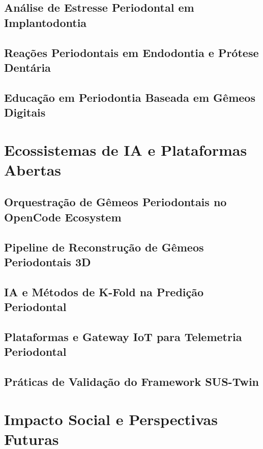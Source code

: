 \documentclass[12pt,a4paper,oneside,openright]{abntex2}
\theoremstyle{definition}
\begin{document}
\chapter{Análise de Estresse Periodontal em Implantodontia} \label{ch:implantodontia}

\chapter{Reações Periodontais em Endodontia e Prótese Dentária} \label{ch:endodontia}

\chapter{Educação em Periodontia Baseada em Gêmeos Digitais} \label{ch:educacao}


\part{Ecossistemas de IA e Plataformas Abertas}
\chapter{Orquestração de Gêmeos Periodontais no OpenCode Ecosystem} \label{ch:opencode}

\chapter{Pipeline de Reconstrução de Gêmeos Periodontais 3D} \label{ch:pipeline}

\chapter{IA e Métodos de K-Fold na Predição Periodontal} \label{ch:ia}

\chapter{Plataformas e Gateway IoT para Telemetria Periodontal} \label{ch:plataformas}

\chapter{Práticas de Validação do Framework SUS-Twin} \label{ch:praticas}


\part{Impacto Social e Perspectivas Futuras}
\end{document}
